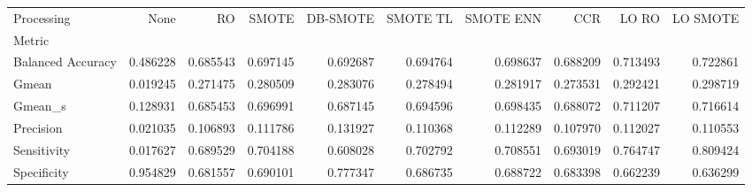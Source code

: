 \begin{tabular}{lrrrrrrrrr}
\toprule
Processing &      None &        RO &     SMOTE &  DB-SMOTE &  SMOTE TL &  SMOTE ENN &       CCR &     LO RO &  LO SMOTE \\
Metric            &           &           &           &           &           &            &           &           &           \\
\midrule
Balanced Accuracy &  0.486228 &  0.685543 &  0.697145 &  0.692687 &  0.694764 &   0.698637 &  0.688209 &  0.713493 &  0.722861 \\
Gmean             &  0.019245 &  0.271475 &  0.280509 &  0.283076 &  0.278494 &   0.281917 &  0.273531 &  0.292421 &  0.298719 \\
Gmean_s           &  0.128931 &  0.685453 &  0.696991 &  0.687145 &  0.694596 &   0.698435 &  0.688072 &  0.711207 &  0.716614 \\
Precision         &  0.021035 &  0.106893 &  0.111786 &  0.131927 &  0.110368 &   0.112289 &  0.107970 &  0.112027 &  0.110553 \\
Sensitivity       &  0.017627 &  0.689529 &  0.704188 &  0.608028 &  0.702792 &   0.708551 &  0.693019 &  0.764747 &  0.809424 \\
Specificity       &  0.954829 &  0.681557 &  0.690101 &  0.777347 &  0.686735 &   0.688722 &  0.683398 &  0.662239 &  0.636299 \\
\bottomrule
\end{tabular}
